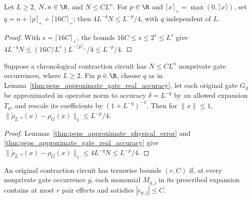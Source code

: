 \begin{lemma}
    \label{thm:peps_approximate_gate_real_accuracy}
    \leanok
    Let $L\ge2$, $N,n\in\N$, and $N\le C L^n$. For $p\in\R$ and
    $\lceil x\rceil_+=\max(0,\lceil x\rceil)$, set
    $q=n+\lceil p\rceil_++\lceil16C\rceil_+$; then $4L^{-q}N\le L^{-p}/4$,
    with $q$ independent of $L$.
\end{lemma}
\begin{proof}
    \leanok
    With $s=\lceil16C\rceil_+$, the bounds $16C\le s\le2^s\le L^s$ give
    $4L^{-q}N\le(16C/L^s)L^{-\lceil p\rceil_+}/4\le L^{-p}/4$.
\end{proof}

\begin{lemma}
    \label{thm:peps_approximate_original_real_accuracy}
    \leanok
    Suppose a chronological contraction circuit has $N\le C L^n$ nonprivate
    gate occurrences, where $L\ge2$. Fix $p\in\R$, choose $q$ as in
    Lemma~\ref{thm:peps_approximate_gate_real_accuracy}, let each original
    gate $G_g$ be approximated in operator norm to accuracy $\delta=L^{-q}$ by
    an allowed expansion $T_g$, and rescale its coefficients by $(1+L^{-q})^{-1}$.
    Then for $\|x\|\le1$,
    $\|\widetilde\rho_{L^{-q}}(x)-\rho_G(x)\|_1\le L^{-p}/4$.
\end{lemma}
\begin{proof}
    \leanok
    Lemmas~\ref{thm:peps_approximate_physical_error} and
    \ref{thm:peps_approximate_gate_real_accuracy} give
    $\|\widetilde\rho_{L^{-q}}(x)-\rho_G(x)\|_1\le4L^{-q}N\le L^{-p}/4$.
\end{proof}

\begin{definition}
    \label{def:peps_original_termwise_bounds}
    \leanok
    An original contraction circuit has termwise bounds $(r,C)$ if, at
    every nonprivate gate occurrence $g$, each monomial $M_{g,j}$ in its
    prescribed expansion contains at most $r$ pair effects and satisfies
    $|c_{g,j}|\le C$.
\end{definition}

